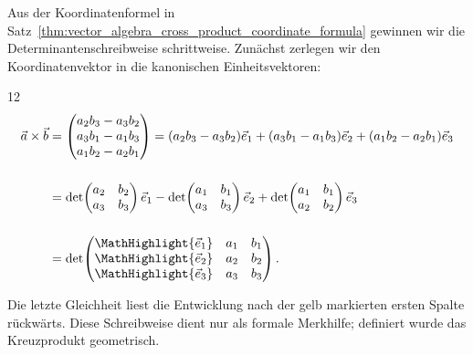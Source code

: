 Aus der Koordinatenformel in
Satz~\ref{thm:vector_algebra_cross_product_coordinate_formula} gewinnen wir
die Determinantenschreibweise schrittweise. Zunächst zerlegen wir den
Koordinatenvektor in die kanonischen Einheitsvektoren:
\begin{ClozeArea}[34]{12}
  \[
    \begin{aligned}
      \vec a\times\vec b
      &=\begin{pmatrix}
          a_2b_3-a_3b_2\\
          a_3b_1-a_1b_3\\
          a_1b_2-a_2b_1
        \end{pmatrix}
        =(a_2b_3-a_3b_2)\vec e_1
        +(a_3b_1-a_1b_3)\vec e_2
        +(a_1b_2-a_2b_1)\vec e_3
        \\[1.4em]
      &=\det\!\begin{pmatrix}
          a_2&b_2\\
          a_3&b_3
        \end{pmatrix}\vec e_1
        -\det\!\begin{pmatrix}
          a_1&b_1\\
          a_3&b_3
        \end{pmatrix}\vec e_2
        +\det\!\begin{pmatrix}
          a_1&b_1\\
          a_2&b_2
        \end{pmatrix}\vec e_3
        \\[1.4em]
      &=\det\!\begin{pmatrix}
          \MathHighlight{\vec e_1}&a_1&b_1\\
          \MathHighlight{\vec e_2}&a_2&b_2\\
          \MathHighlight{\vec e_3}&a_3&b_3
        \end{pmatrix}.
    \end{aligned}
  \]
\end{ClozeArea}
Die letzte Gleichheit liest die Entwicklung nach der gelb markierten ersten
Spalte rückwärts. Diese Schreibweise dient nur als formale Merkhilfe;
definiert wurde das Kreuzprodukt geometrisch.

